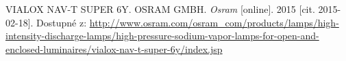 \begin{thebibliography}{1}

VIALOX NAV-T SUPER 6Y. OSRAM GMBH. \textit{Osram} [online]. 2015 [cit. 2015-02-18]. Dostupné z: \url{http://www.osram.com/osram_com/products/lamps/high-intensity-discharge-lamps/high-pressure-sodium-vapor-lamps-for-open-and-enclosed-luminaires/vialox-nav-t-super-6y/index.jsp}

\end{thebibliography}
